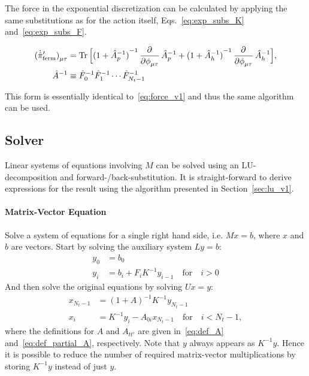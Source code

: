 \documentclass[a4paper, fleqn, twoside, notitlepage]{scrartcl}
\begin{document}
\noindent
The force in the exponential discretization can be calculated by applying the same substitutions as for the action itself, Eqs.~\eqref{eq:exp_subs_K} and~\eqref{eq:exp_subs_F}.
\begin{resultbox}
  \vspace{-\baselineskip}
  \begin{align}
    {(\dot{\hat{\pi}}'_{\text{ferm}})}_{\mu\tau} &= \Tr \Big[{(1+\hat{A}_p^{-1})}^{-1}\dpd{}{\phi_{\mu\tau}}\hat{A}_p^{-1} + {(1+\hat{A}_h^{-1})}^{-1}\dpd{}{\phi_{\mu\tau}}\hat{A}_h^{-1}\Big],\\
    \hat{A}^{-1} &\equiv \hat{F}_0^{-1} \hat{F}_1^{-1} \cdots \hat{F}_{N_t-1}^{-1}
  \end{align}
\end{resultbox}
\noindent
This form is essentially identical to~\eqref{eq:force_v1} and thus the same algorithm can be used.


\subsection{Solver}\label{sec:solver_v1}

Linear systems of equations involving $M$ can be solved using an LU-decomposition and forward-/back-substitution.
It is straight-forward to derive expressions for the result using the algorithm presented in Section~\ref{sec:lu_v1}.

\paragraph{Matrix-Vector Equation}
Solve a system of equations for a single right hand side, i.e. $M x = b$, where $x$ and $b$ are vectors.
Start by solving the auxiliary system $L y = b$:
\begin{align}
  y_0 &= b_0\\
  y_i &= b_i + F_i K^{-1}y_{i-1} \quad \text{for} \quad i > 0
\end{align}
And then solve the original equations by solving $U x = y$:
\begin{align}
  x_{N_t-1} &= {(1+A)}^{-1} K^{-1} y_{N_t-1}\\
  x_i &= K^{-1} y_i - A_{0i}x_{N_t-1} \quad \text{for} \quad i < N_t-1,
\end{align}
where the definitions for $A$ and $A_{tt'}$ are given in~\eqref{eq:def_A} and~\eqref{eq:def_partial_A}, respectively.
Note that $y$ always appears as $K^{-1}y$. Hence it is possible to reduce the number of required matrix-vector multiplications by storing $K^{-1}y$ instead of just $y$.
\end{document}
